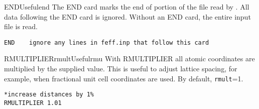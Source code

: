 \documentclass[11pt,oneside]{report} %
\begin{document}
\begin{Card}{END}{}{Useful}{end}
  The END card marks the end of portion of the  file
  read by {\feff}.  All data following the END card is ignored.
  Without an END card, the entire input file is read.
\begin{verbatim}
END    ignore any lines in feff.inp that follow this card
\end{verbatim}
\end{Card}


\begin{Card}{RMULTIPLIER}{rmult}{Useful}{rmu}
  With RMULTIPLIER all atomic coordinates are multiplied by the
  supplied value.  This is useful to adjust lattice spacing, for
  example, when fractional unit cell coordinates are used.  By
  default, \texttt{rmult}=1.
\begin{verbatim}
*increase distances by 1%
RMULTIPLIER 1.01
\end{verbatim}
\end{Card}
\end{document}
